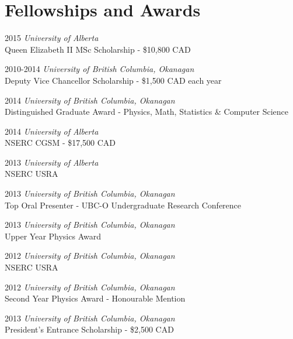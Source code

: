 \documentclass[letterpaper,11pt]{article}
\newlength{\mainindent} \setlength{\mainindent}{12pt}
\newlength{\contentindent} \setlength{\contentindent}{19ex}
\newenvironment{datelist}{
  \begingroup
  \raggedright
  \begin{description}[labelindent=\mainindent,leftmargin=\contentindent,
      style=sameline,font=\normalfont,topsep=0pt,partopsep=0pt,parsep=0pt,
      itemsep=4pt]
}{
  \end{description}
  \endgroup
}
\begin{document}
\section*{Fellowships and Awards}
\begin{datelist}
\item[2015] \emph{University of Alberta} \\ Queen Elizabeth II MSc Scholarship - \$10,800 CAD
\item[2010-2014] \emph{University of British Columbia, Okanagan} \\ Deputy Vice Chancellor Scholarship - \$1,500 CAD each year
\item[2014] \emph{University of British Columbia, Okanagan} \\ Distinguished Graduate Award - Physics, Math, Statistics \& Computer Science
\item[2014] \emph{University of Alberta} \\ NSERC CGSM - \$17,500 CAD
\item[2013] \emph{University of Alberta} \\ NSERC USRA
\item[2013] \emph{University of British Columbia, Okanagan} \\ Top Oral Presenter - UBC-O Undergraduate Research Conference
\item[2013] \emph{University of British Columbia, Okanagan} \\ Upper Year Physics Award
\item[2012] \emph{University of British Columbia, Okanagan} \\ NSERC USRA
\item[2012] \emph{University of British Columbia, Okanagan} \\ Second Year Physics Award - Honourable Mention
\item[2013] \emph{University of British Columbia, Okanagan} \\ President's Entrance Scholarship - \$2,500 CAD
\end{datelist}
\end{document}
